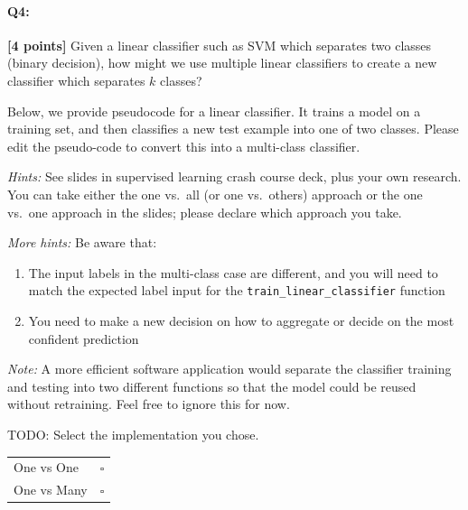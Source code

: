 








\pagebreak
\paragraph{Q4:} \textbf{[4 points]} Given a linear classifier such as SVM which separates two classes (binary decision), how might we use multiple linear classifiers to create a new classifier which separates $k$ classes?

Below, we provide pseudocode for a linear classifier. It trains a model on a training set, and then classifies a new test example into one of two classes. Please edit the pseudo-code to convert this into a multi-class classifier. 

\emph{Hints:} See slides in supervised learning crash course deck, plus your own research. You can take either the one vs.~all (or one vs.~others) approach or the one vs.~one approach in the slides; please declare which approach you take.

\emph{More hints:} Be aware that:
\begin{enumerate}
    \item The input labels in the multi-class case are different, and you will need to match the expected label input for the \texttt{train\_linear\_classifier} function
    \item You need to make a new decision on how to aggregate or decide on the most confident prediction
\end{enumerate}

\emph{Note:} A more efficient software application would separate the classifier training and testing into two different functions so that the model could be reused without retraining. Feel free to ignore this for now.


\begin{mdframed}
TODO: Select the implementation you chose.

\begin{tabular}[h]{lc}
\bottomrule
One vs One & $\square$ \\
One vs Many & $\square$ \\
\toprule
\end{tabular}
\end{mdframed}

